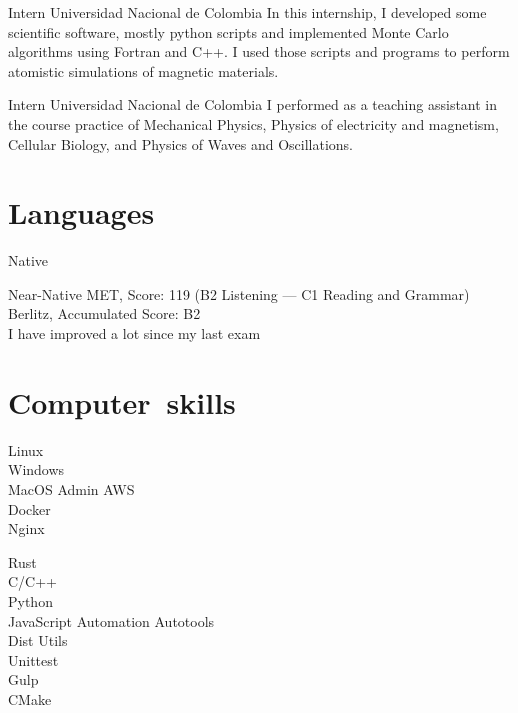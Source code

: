 \documentclass[12pt,english]{moderncv}
\begin{document}
        {Intern}
        {Universidad Nacional de Colombia}
        {}
        {}
        {%
            In this internship, I developed some scientific software, mostly
            python scripts and implemented Monte Carlo algorithms using Fortran
            and C++. I used those scripts and programs to perform atomistic
            simulations of magnetic materials.
        }

        {Intern}
        {Universidad Nacional de Colombia}
        {}
        {}
        {%
            I performed as a teaching assistant in the course practice of
            Mechanical Physics, Physics of electricity and magnetism, Cellular
            Biology, and Physics of Waves and Oscillations.
        }


\section{Languages}

           {Native}
           {}

           {Near-Native}
           {%
               MET, Score: 119 (B2 Listening --- C1 Reading and Grammar)\\
               Berlitz, Accumulated Score: B2\\
               I have improved a lot since my last exam
           }

\section{Computer~skills}

            {Linux\\Windows\\MacOS}
           {Admin}         {AWS\\Docker\\Nginx}

   {Rust\\C/C++\\Python\\JavaScript}
           {Automation}    {Autotools\\Dist Utils\\Unittest\\Gulp\\CMake}
\end{document}
